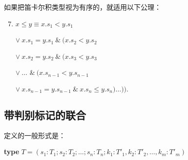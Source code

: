 如果把笛卡尔积类型视为有序的，就适用以下公理：
	
\begin{enumerate}[leftmargin=2\parindent, label=(\arabic*)]
	\setcounter{enumi}{6}
	\item $x \leqslant y \equiv$\quad $x.s_1 < y.s_1$
		
	\tabto*{3.2em}$\vee\ x.s_1 = y.s_1\ \&\ (x.s_2 < y.s_2$
	
	\tabto*{3.2em}$\vee\ x.s_2 = y.s_2\ \&\ (x.s_3 < y.s_3$
	
	\tabto*{3.2em}$\vee\ \dots$ \tabto*{8.6em}$\&\ (x.s_{n - 1} < y.s_{n-1}$
	
	\tabto*{3.2em}$\vee\ x.s_{n-1} = y.s_{n-1}\ \&\ x.s_n \leqslant y.s_n)\dots)).$
\end{enumerate}

\subsection{带判别标记的联合}

定义的一般形式是：

\quad \textbf{type} $T = (s_1: T_1; s_2: T_2; \dots ; s_n:T_n; k_1: T'_1, k_2:T'_2, \dots , k_m: T'_m)$

